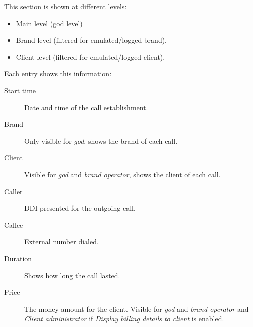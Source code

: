 \documentclass[letterpaper,10pt,english]{sphinxmanual}
\begin{document}
This section is shown at different levels:
\begin{itemize}
\item {} 
Main level (god level)

\item {} 
Brand level (filtered for emulated/logged brand).

\item {} 
Client level (filtered for emulated/logged client).

\end{itemize}

Each entry shows this information:
\begin{description}
\item[{Start time}] \leavevmode{}\label{administration_portal/client/residential/calls/external_calls:term-start-time}
Date and time of the call establishment.

\item[{Brand}] \leavevmode{}\label{administration_portal/client/residential/calls/external_calls:term-brand}
Only visible for \emph{god}, shows the brand of each call.

\item[{Client}] \leavevmode{}\label{administration_portal/client/residential/calls/external_calls:term-client}
Visible for \emph{god} and \emph{brand operator}, shows the client of each call.

\item[{Caller}] \leavevmode{}\label{administration_portal/client/residential/calls/external_calls:term-caller}
DDI presented for the outgoing call.

\item[{Callee}] \leavevmode{}\label{administration_portal/client/residential/calls/external_calls:term-callee}
External number dialed.

\item[{Duration}] \leavevmode{}\label{administration_portal/client/residential/calls/external_calls:term-duration}
Shows how long the call lasted.

\item[{Price}] \leavevmode{}\label{administration_portal/client/residential/calls/external_calls:term-price}
The money amount for the client. Visible for \emph{god} and \emph{brand operator} and \emph{Client administrator} if
\emph{Display billing details to client} is enabled.


\end{description}
\end{document}
